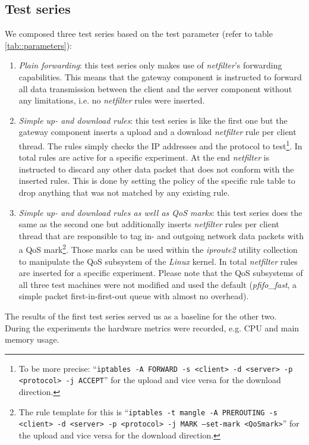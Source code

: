 \documentclass{sig-alternate}
\begin{document}
\subsection{Test series}
\noindent We composed three test series based on the test pa\-ra\-me\-ter  
(refer to table \ref{tab::parameters}):
\begin{enumerate}
\item \emph{Plain forwarding}: this test series only makes use of 
\emph{netfilter}'s forwarding capabilities. This means that the gateway 
component is instructed to forward all data transmission between the client and 
the server component without any limitations, i.e. no \emph{netfilter} rules 
were inserted.
\item \emph{Simple up- and download rules}: this test series is like the first 
one but the gateway component inserts a upload and a download \emph{netfilter} 
rule per client thread. The rules simply checks the IP addresses and the 
protocol to test\footnote{To be more precise: ``\texttt{iptables -A 
FORWARD -s <client> -d <server> -p <protocol> -j ACCEPT}'' for the upload and 
vice versa for the download direction.}. In total  rules are active 
for a specific experiment. At the end \emph{netfilter} is instructed to discard 
any other data packet that does not conform with the inserted rules. This is 
done by setting the policy of the specific rule table to drop anything that was 
not matched by any existing rule.
\newpage\item \emph{Simple up- and download rules as well as QoS marks}: this 
test series does the same as the se\-cond one but additionally inserts 
\emph{netfilter} rules per client thread that are responsible to tag in- and 
outgoing network data packets with a QoS mark\footnote{The rule template for 
this is ``\texttt{iptables -t mangle -A PREROUTING -s <client> -d <server> -p 
<protocol> -j MARK --set-mark <QoSmark>}'' for the upload and vice versa for 
the download direction.}. Those marks can be used within the \emph{iproute2}
uti\-li\-ty collection to manipulate the QoS subsystem of the \emph{Linux} 
kernel. In total  \emph{netfilter} rules are inserted for a specific 
experiment. Please note that the QoS subsystems of all three test machines were 
not modified and used the default (\emph{pfifo\_fast}, a simple packet 
first-in-first-out queue with almost no overhead).
\end{enumerate}
The results of the first test series served us as a baseline for the other two. 
During the experiments the hardware metrics were recorded, e.g. CPU and main 
memory usa\-ge.
\end{document}
